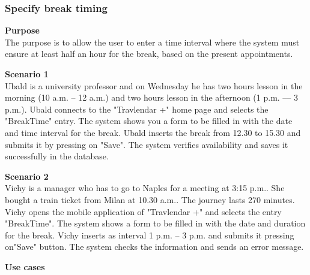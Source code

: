 \documentclass{article}
\begin{document}
	\subsubsection{Specify break timing}
	
	\bigskip
	\noindent
	\textbf{Purpose} \\
	The purpose is to allow the user to enter a time interval where the system must ensure at least half an hour for the break, based on the present appointments.
	
	\bigskip
	\noindent
	\textbf{Scenario 1} \\
	Ubald is a university professor and on Wednesday he has two hours lesson in the morning (10 a.m. -- 12 a.m.) and two hours lesson in the afternoon (1 p.m. –-- 3 p.m.). Ubald connects to the "Travlendar +" home page and selects the "BreakTime" entry. The system shows you a form to be filled in with the date and time interval for the break. Ubald inserts the break  from 12.30 to 15.30 and submits it by pressing on "Save". The system verifies availability and saves it successfully in the database.
	
	\bigskip
	\noindent
	\textbf{Scenario 2} \\
	Vichy is a manager who has to go to Naples for a meeting at 3:15 p.m.. She bought a train ticket from Milan at 10.30 a.m.. The journey lasts 270 minutes. Vichy opens the mobile application of "Travlendar +" and selects the entry "BreakTime". The system shows a form to be filled in with the date and duration for the break. Vichy inserts as interval 1 p.m. -- 3 p.m. and submits it pressing on"Save" button. The system checks the information and sends an error message.
	
	\bigskip
	\noindent
	\textbf{Use cases} \\
	
\end{document}
